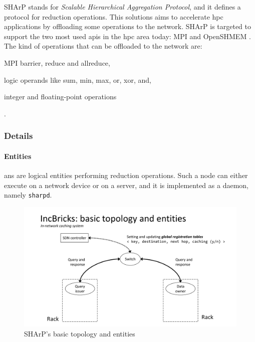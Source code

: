SHArP \cite{sharp} stands for \textit{Scalable Hierarchical Aggregation Protocol}, and it defines a protocol for reduction operations.
This solutions aims to accelerate \gls{hpc} applications by offloading some operations to the network. SHArP \cite{sharp} is targeted to support the two most used \glspl{api} in the \gls{hpc} area today: MPI \cite{mpi} and OpenSHMEM \cite{openshmem}.
The kind of operations that can be offloaded to the network are:
\begin{mylist}
    \item MPI \cite{mpi} barrier, reduce and allreduce,
    \item logic operands like sum, min, max, or, xor, and,
    \item integer and floating-point operations
\end{mylist}.

\subsubsection{Details}
\paragraph{Entities}
\glspl{an} are logical entities performing reduction operations.
Such a node can either execute on a network device or on a server, and it is implemented as a daemon, namely \texttt{sharpd}.

\begin{figure}[!htb]
    \centering
        \includegraphics[page=13, clip, trim=3.6cm 1.3cm 3.6cm 4.8cm, width=1.00\textwidth]{figures/analysis/inp/presentation.pdf}
    \caption{SHArP's \texorpdfstring{\cite{sharp}}{} basic topology and entities}
\end{figure}

